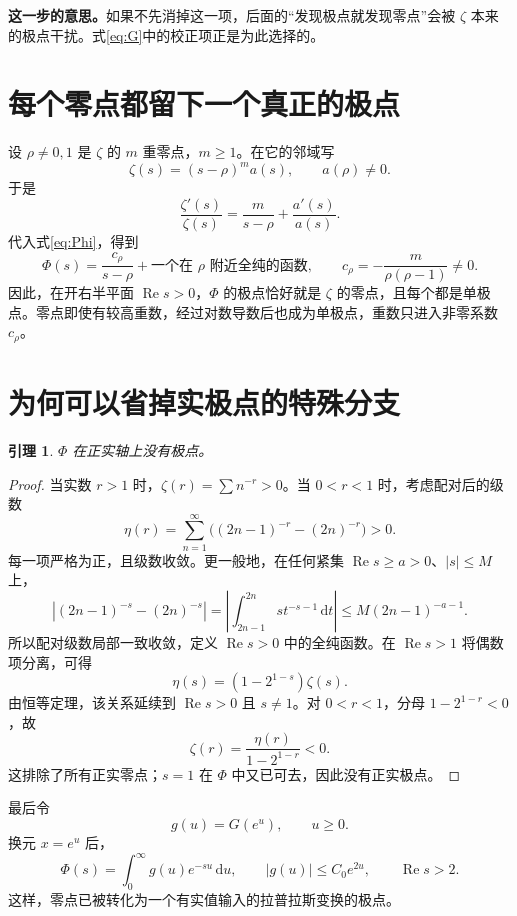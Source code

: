 \documentclass[UTF8,fontset=fandol,a4paper,openany,oneside]{ctexbook}
\newtheorem{lemma}[theorem]{引理}
\theoremstyle{definition}
\theoremstyle{remark}
\newcommand{\Rea}{\operatorname{Re}}
\newcommand{\dd}{\,\mathrm d}
\newcommand{\Expl}[1]{\par\smallskip\noindent\textbf{这一步的意思。}#1\par\smallskip}
\begin{document}
\Expl{如果不先消掉这一项，后面的“发现极点就发现零点”会被 $\zeta$ 本来的极点干扰。式\eqref{eq:G}中的校正项正是为此选择的。}

\section{每个零点都留下一个真正的极点}
设 $\rho\ne0,1$ 是 $\zeta$ 的 $m$ 重零点，$m\ge1$。在它的邻域写
\[
\zeta(s)=(s-\rho)^m a(s),\qquad a(\rho)\ne0.
\]
于是
\[
\frac{\zeta'(s)}{\zeta(s)}=
\frac m{s-\rho}+\frac{a'(s)}{a(s)}.
\]
代入式\eqref{eq:Phi}，得到
\begin{equation}
\Phi(s)=\frac{c_\rho}{s-\rho}+\text{一个在 $\rho$ 附近全纯的函数},
\qquad c_\rho=-\frac{m}{\rho(\rho-1)}\ne0.
\label{eq:residue}
\end{equation}
因此，在开右半平面 $\Rea s>0$，$\Phi$ 的极点恰好就是 $\zeta$ 的零点，且每个都是单极点。零点即使有较高重数，经过对数导数后也成为单极点，重数只进入非零系数 $c_\rho$。

\section{为何可以省掉实极点的特殊分支}
\begin{lemma}
\label{lem:no-real-poles}
$\Phi$ 在正实轴上没有极点。
\end{lemma}
\begin{proof}
当实数 $r>1$ 时，$\zeta(r)=\sum n^{-r}>0$。当 $0<r<1$ 时，考虑配对后的级数
\[
\eta(r)=\sum_{n=1}^\infty\bigl((2n-1)^{-r}-(2n)^{-r}\bigr)>0.
\]
每一项严格为正，且级数收敛。更一般地，在任何紧集 $\Rea s\ge a>0$、$|s|\le M$ 上，
\[
\left|(2n-1)^{-s}-(2n)^{-s}\right|
=\left|\int_{2n-1}^{2n}s t^{-s-1}\dd t\right|
\le M(2n-1)^{-a-1}.
\]
所以配对级数局部一致收敛，定义 $\Rea s>0$ 中的全纯函数。在 $\Rea s>1$ 将偶数项分离，可得
\[
\eta(s)=(1-2^{1-s})\zeta(s).
\]
由恒等定理，该关系延续到 $\Rea s>0$ 且 $s\ne1$。对 $0<r<1$，分母 $1-2^{1-r}<0$，故
\[
\zeta(r)=\frac{\eta(r)}{1-2^{1-r}}<0.
\]
这排除了所有正实零点；$s=1$ 在 $\Phi$ 中又已可去，因此没有正实极点。
\end{proof}

最后令
\begin{equation}
g(u)=G(e^u),\qquad u\ge0.
\label{eq:g}
\end{equation}
换元 $x=e^u$ 后，
\begin{equation}
\Phi(s)=\int_0^\infty g(u)e^{-su}\dd u,
\qquad |g(u)|\le C_0e^{2u},\qquad \Rea s>2.
\label{eq:Laplace}
\end{equation}
这样，零点已被转化为一个有实值输入的拉普拉斯变换的极点。
\end{document}
